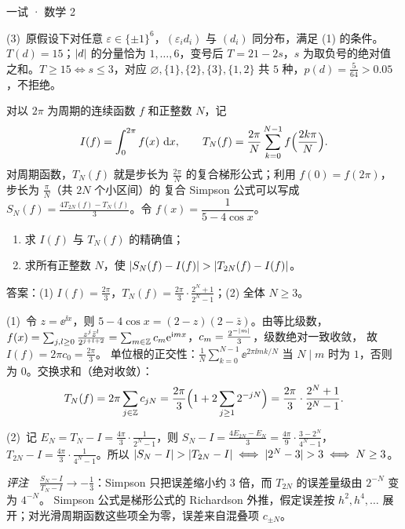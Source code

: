 \documentclass[cjk=noto, seal=first]{mojing-exam}
\begin{document}
\begin{paper}[time={建议 3 小时（训练设置）}, full=150]{一试 · 数学 2}
\begin{questions}
\begin{solution}
(3)~原假设下对任意 $\varepsilon\in\{\pm1\}^6$，$(\varepsilon_id_i)$ 与 $(d_i)$ 同分布，满足 (1) 的条件。$T(d)=15$；$\lvert d\rvert$ 的分量恰为
$1,\dots,6$，变号后 $T=21-2s$，$s$ 为取负号的绝对值之和。$T\ge15\iff s\le3$，对应 $\varnothing,\{1\},\{2\},\{3\},\{1,2\}$
共 $5$ 种，$p(d)=\frac5{64}>0.05$，不拒绝。
\end{solution}

\question[20]
对以 $2\pi$ 为周期的连续函数 $f$ 和正整数 $N$，记
\[
  I(f)=\int_0^{2\pi}f(x)\,\mathop{}\!\mathrm{d} x,\qquad T_N(f)=\frac{2\pi}N\sum_{k=0}^{N-1}f\Bigl(\frac{2k\pi}N\Bigr).
\]
对周期函数，$T_N(f)$ 就是步长为 $\frac{2\pi}N$ 的复合梯形公式；利用 $f(0)=f(2\pi)$，步长为 $\frac\pi N$（共 $2N$ 个小区间）的
复合 Simpson 公式可以写成 $S_N(f)=\frac{4T_{2N}(f)-T_N(f)}3$。令 $f(x)=\dfrac{1}{5-4\cos x}$。
\begin{enumerate}
  \item 求 $I(f)$ 与 $T_N(f)$ 的精确值；
  \item 求所有正整数 $N$，使 $\lvert S_N(f)-I(f)\rvert>\lvert T_{2N}(f)-I(f)\rvert$。
\end{enumerate}
\answerspace{2cm}
\begin{solution}
答案：(1) $I(f)=\frac{2\pi}3$，$T_N(f)=\frac{2\pi}3\cdot\frac{2^N+1}{2^N-1}$；(2) 全体 $N\ge3$。

(1)~令 $z=\ee^{\ii x}$，则 $5-4\cos x=(2-z)(2-\bar z)$。由等比级数，
$f(x)=\sum_{j,l\ge0}\frac{z^j\bar z^l}{2^{j+l+2}}=\sum_{m\in\mathbb{Z}}c_m\mathrm{e}^{\mathrm{i} mx}$，$c_m=\frac{2^{-\lvert m\rvert}}3$，级数绝对一致收敛，
故 $I(f)=2\pi c_0=\frac{2\pi}3$。
单位根的正交性：$\frac1N\sum_{k=0}^{N-1}\ee^{2\pi\ii mk/N}$ 当 $N\mid m$ 时为 $1$，否则为 $0$。交换求和（绝对收敛）：
\[
  T_N(f)=2\pi\sum_{j\in\mathbb{Z}}c_{jN}=\frac{2\pi}3\Bigl(1+2\sum_{j\ge1}2^{-jN}\Bigr)=\frac{2\pi}{3}\cdot\frac{2^N+1}{2^N-1}.
\]

(2)~记 $E_N=T_N-I=\frac{4\pi}3\cdot\frac1{2^N-1}$，则 $S_N-I=\frac{4E_{2N}-E_N}3=\frac{4\pi}9\cdot\frac{3-2^N}{4^N-1}$，
$T_{2N}-I=\frac{4\pi}3\cdot\frac1{4^N-1}$。所以
$\lvert S_N-I\rvert>\lvert T_{2N}-I\rvert\iff\lvert2^N-3\rvert>3\iff N\ge3$。

\emph{评注}　$\frac{S_N-I}{T_N-I}\to-\frac13$：Simpson 只把误差缩小约 $3$ 倍，而 $T_{2N}$ 的误差量级由 $2^{-N}$ 变为 $4^{-N}$。
Simpson 公式是梯形公式的 Richardson 外推，假定误差按 $h^2,h^4,\dots$ 展开；对光滑周期函数这些项全为零，误差来自混叠项 $c_{\pm N}$。
\end{solution}


\end{questions}
\end{paper}
\end{document}
